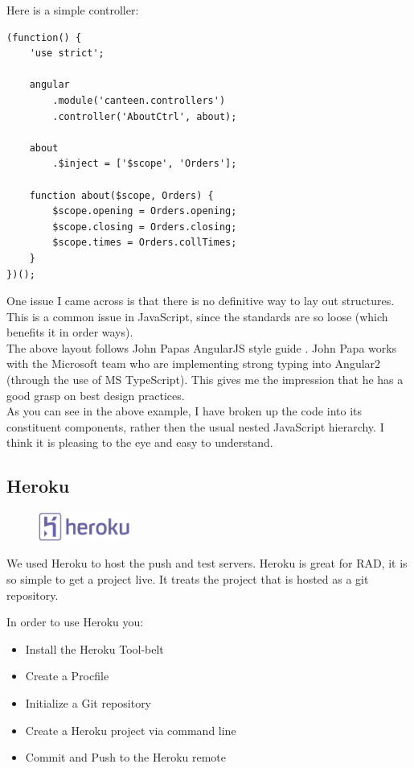 \pagebreak
Here is a simple controller:
\begin{verbatim}
(function() {
    'use strict';

    angular
        .module('canteen.controllers')
        .controller('AboutCtrl', about);

    about
        .$inject = ['$scope', 'Orders'];

    function about($scope, Orders) {
        $scope.opening = Orders.opening;
        $scope.closing = Orders.closing;
        $scope.times = Orders.collTimes;
    }
})();
\end{verbatim}
One issue I came across is that there is no definitive way to lay out structures.
This is a common issue in JavaScript, since the standards are so loose (which benefits it in order ways).
\\

The above layout follows John Papas AngularJS style guide \cite{angular_style_guide}.
John Papa works with the Microsoft team who are implementing strong typing into Angular2 (through the use of MS TypeScript).
This gives me the impression that he has a good grasp on best design practices.
\\

As you can see in the above example, I have broken up the code into its constituent components, rather then the usual nested JavaScript hierarchy.
I think it is pleasing to the eye and easy to understand.

\subsection{Heroku}
\begin{figure}
	\includegraphics[width=3cm]{img/mobile-app/logos/heroku.jpg}
\end{figure} 
We used Heroku \cite{heroku} to host the push and test servers.
Heroku is great for RAD, it is so simple to get a project live.
It treats the project that is hosted as a git repository.

In order to use Heroku you:
\begin{itemize}
	\item Install the Heroku Tool-belt
	\item Create a Procfile
	\item Initialize a Git repository
	\item Create a Heroku project via command line
	\item Commit and Push to the Heroku remote
\end{itemize}

